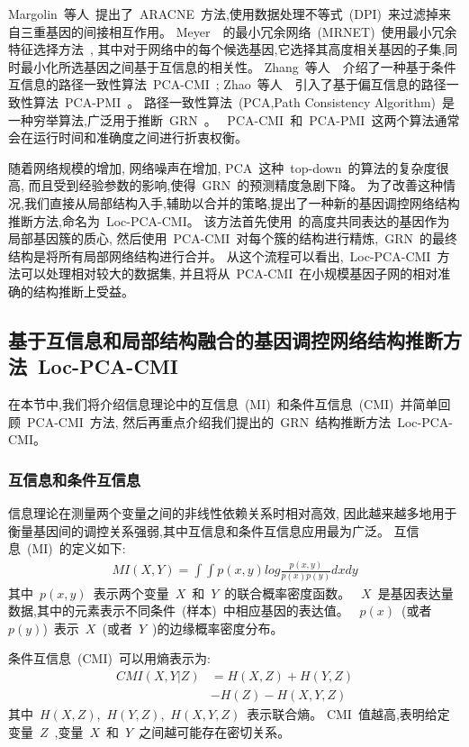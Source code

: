 Margolin~等人~\cite{margolin2006aracne}提出了~ARACNE~方法,使用数据处理不等式~(DPI)~来过滤掉来自三重基因的间接相互作用。
Meyer~\cite{meyer2007information}~的最小冗余网络~(MRNET)~使用最小冗余特征选择方法~\cite{peng2005feature},
其中对于网络中的每个候选基因,它选择其高度相关基因的子集,同时最小化所选基因之间基于互信息的相关性。
Zhang~等人~\cite{zhang2011inferring}~介绍了一种基于条件互信息的路径一致性算法~PCA-CMI~; 
Zhao~等人~\cite{zhao2016part}~引入了基于偏互信息的路径一致性算法~PCA-PMI~。
路径一致性算法~(PCA,Path Consistency Algorithm)~是一种穷举算法,广泛用于推断~GRN~\cite{zhang2011inferring}。
~PCA-CMI~和~PCA-PMI~这两个算法通常会在运行时间和准确度之间进行折衷权衡。

随着网络规模的增加, 网络噪声在增加,
PCA~这种~top-down~的算法的复杂度很高, 而且受到经验参数的影响,使得~GRN~的预测精度急剧下降。
为了改善这种情况,我们直接从局部结构入手,辅助以合并的策略,提出了一种新的基因调控网络结构推断方法,命名为~Loc-PCA-CMI。
该方法首先使用~的高度共同表达的基因作为局部基因簇的质心,
然后使用~PCA-CMI~对每个簇的结构进行精炼,~GRN~的最终结构是将所有局部网络结构进行合并。
从这个流程可以看出,~Loc-PCA-CMI~方法可以处理相对较大的数据集,
并且将从~PCA-CMI~在小规模基因子网的相对准确的结构推断上受益。

\subsection{基于互信息和局部结构融合的基因调控网络结构推断方法~Loc-PCA-CMI}
在本节中,我们将介绍信息理论中的互信息~(MI)~和条件互信息~(CMI)~并简单回顾~PCA-CMI~方法,
然后再重点介绍我们提出的~GRN~结构推断方法~Loc-PCA-CMI。

\subsubsection{互信息和条件互信息}
\label{relatedwork}
信息理论在测量两个变量之间的非线性依赖关系时相对高效, 
因此越来越多地用于衡量基因间的调控关系强弱,其中互信息和条件互信息应用最为广泛。
互信息~(MI)~的定义如下:
\begin{align} %
    MI(X,Y)=\int \int p(x,y)log \frac{p(x,y)}{p(x)p(y)}dxdy
 \end{align}
 其中~$p(x,y)$~表示两个变量~$X$~和~$Y$~的联合概率密度函数。
~$X$~是基因表达量数据,其中的元素表示不同条件~(样本)~中相应基因的表达值。
~$p(x)$~(或者~$p(y)$)~表示~$X$~(或者~$Y$~)的边缘概率密度分布。

条件互信息~(CMI)~可以用熵表示为:
\begin{equation}
\begin{split}
CMI(X,Y|Z) &= H(X,Z) + H(Y,Z)\\
               & - H(Z) - H(X,Y,Z)
\end{split}
\end{equation}
其中~$H(X,Z)$,~$H(Y,Z)$,~$H(X,Y,Z)$~表示联合熵。
CMI~值越高,表明给定变量~$Z$~,变量~$X$~和~$Y$~之间越可能存在密切关系。

